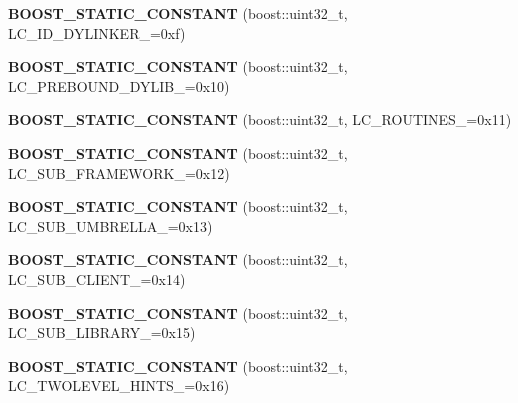 \begin{DoxyCompactItemize}
\item 
{\bfseries B\+O\+O\+S\+T\+\_\+\+S\+T\+A\+T\+I\+C\+\_\+\+C\+O\+N\+S\+T\+A\+NT} (boost\+::uint32\+\_\+t, L\+C\+\_\+\+I\+D\+\_\+\+D\+Y\+L\+I\+N\+K\+E\+R\+\_\+=0xf)\hypertarget{a00194_ae32900dd094adadbbceb64a0342aad37}{}\label{a00194_ae32900dd094adadbbceb64a0342aad37}

\item 
{\bfseries B\+O\+O\+S\+T\+\_\+\+S\+T\+A\+T\+I\+C\+\_\+\+C\+O\+N\+S\+T\+A\+NT} (boost\+::uint32\+\_\+t, L\+C\+\_\+\+P\+R\+E\+B\+O\+U\+N\+D\+\_\+\+D\+Y\+L\+I\+B\+\_\+=0x10)\hypertarget{a00194_a1b6f018aec128a2631bf6967aea98ed2}{}\label{a00194_a1b6f018aec128a2631bf6967aea98ed2}

\item 
{\bfseries B\+O\+O\+S\+T\+\_\+\+S\+T\+A\+T\+I\+C\+\_\+\+C\+O\+N\+S\+T\+A\+NT} (boost\+::uint32\+\_\+t, L\+C\+\_\+\+R\+O\+U\+T\+I\+N\+E\+S\+\_\+=0x11)\hypertarget{a00194_ad1131bfba2fa6f9dd5f0ea8920a381c2}{}\label{a00194_ad1131bfba2fa6f9dd5f0ea8920a381c2}

\item 
{\bfseries B\+O\+O\+S\+T\+\_\+\+S\+T\+A\+T\+I\+C\+\_\+\+C\+O\+N\+S\+T\+A\+NT} (boost\+::uint32\+\_\+t, L\+C\+\_\+\+S\+U\+B\+\_\+\+F\+R\+A\+M\+E\+W\+O\+R\+K\+\_\+=0x12)\hypertarget{a00194_a9c41f0e7dc278391f579f77e91a07386}{}\label{a00194_a9c41f0e7dc278391f579f77e91a07386}

\item 
{\bfseries B\+O\+O\+S\+T\+\_\+\+S\+T\+A\+T\+I\+C\+\_\+\+C\+O\+N\+S\+T\+A\+NT} (boost\+::uint32\+\_\+t, L\+C\+\_\+\+S\+U\+B\+\_\+\+U\+M\+B\+R\+E\+L\+L\+A\+\_\+=0x13)\hypertarget{a00194_a1df09850516fe437ff713cb79cc9aa75}{}\label{a00194_a1df09850516fe437ff713cb79cc9aa75}

\item 
{\bfseries B\+O\+O\+S\+T\+\_\+\+S\+T\+A\+T\+I\+C\+\_\+\+C\+O\+N\+S\+T\+A\+NT} (boost\+::uint32\+\_\+t, L\+C\+\_\+\+S\+U\+B\+\_\+\+C\+L\+I\+E\+N\+T\+\_\+=0x14)\hypertarget{a00194_acb528f4af43aa526018d244e8d9f629b}{}\label{a00194_acb528f4af43aa526018d244e8d9f629b}

\item 
{\bfseries B\+O\+O\+S\+T\+\_\+\+S\+T\+A\+T\+I\+C\+\_\+\+C\+O\+N\+S\+T\+A\+NT} (boost\+::uint32\+\_\+t, L\+C\+\_\+\+S\+U\+B\+\_\+\+L\+I\+B\+R\+A\+R\+Y\+\_\+=0x15)\hypertarget{a00194_a870c906c9b1cde926a0cef6062da656c}{}\label{a00194_a870c906c9b1cde926a0cef6062da656c}

\item 
{\bfseries B\+O\+O\+S\+T\+\_\+\+S\+T\+A\+T\+I\+C\+\_\+\+C\+O\+N\+S\+T\+A\+NT} (boost\+::uint32\+\_\+t, L\+C\+\_\+\+T\+W\+O\+L\+E\+V\+E\+L\+\_\+\+H\+I\+N\+T\+S\+\_\+=0x16)\hypertarget{a00194_a7440e6fdac527eb9187d0c9dd9b6329d}{}\label{a00194_a7440e6fdac527eb9187d0c9dd9b6329d}


\end{DoxyCompactItemize}
